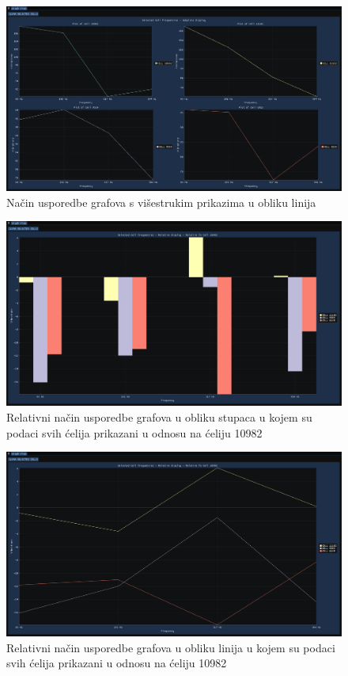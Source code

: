 \documentclass[times, utf8, diplomski]{fer}
\begin{document}
\begin{figure}[H]
	\centering
	\includegraphics[width=\textwidth]{subplots_graph_display_lines.png}
	\caption{Način usporedbe grafova s višestrukim prikazima u obliku linija}
    \label{appendix:subplots_graph_display_lines}
\end{figure}

\begin{figure}[H]
	\centering
	\includegraphics[width=\textwidth]{relative_graph_display_bars_cell_10982.png}
	\caption{Relativni način usporedbe grafova u obliku stupaca u kojem su podaci svih ćelija prikazani u odnosu na ćeliju 10982}
    \label{appendix:relative_graph_display_bars}
\end{figure}

\begin{figure}[H]
	\centering
	\includegraphics[width=\textwidth]{relative_graph_display_lines_cell_10982.png}
	\caption{Relativni način usporedbe grafova u obliku linija u kojem su podaci svih ćelija prikazani u odnosu na ćeliju 10982}
    \label{appendix:relative_graph_display_lines}
\end{figure}
\end{document}
